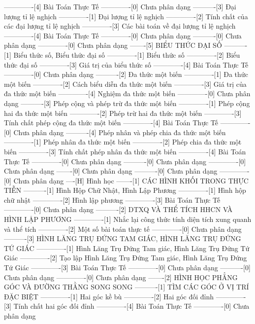 -------------[4] Bài Toán Thực Tế
-------------[0] Chưa phân dạng
----------[3] Đại lượng tỉ lệ nghịch
-------------[1] Đại lượng tỉ lệ nghịch
-------------[2] Tính chất của các đại lượng tỉ lệ nghịch
-------------[3] Các bài toán về đại lượng tỉ lệ nghịch
-------------[4] Bài Toán Thực Tế
-------------[0] Chưa phân dạng
----------[0] Chưa phân dạng
-------------[0] Chưa phân dạng
-------[5] BIỂU THỨC ĐẠI SỐ
----------[1] Biểu thức số, Biểu thức đại số
-------------[1] Biểu thức số
-------------[2] Biểu thức đại số
-------------[3] Giá trị của biểu thức số
-------------[4] Bài Toán Thực Tế
-------------[0] Chưa phân dạng
----------[2] Đa thức một biến
-------------[1] Đa thức một biến
-------------[2] Cách biểu diễn đa thức một biến
-------------[3] Giá trị của đa thức một biến
-------------[4] Nghiệm đa thức một biến
-------------[0] Chưa phân dạng
----------[3] Phép cộng và phép trừ đa thức một biến
-------------[1] Phép cộng hai đa thức một biến
-------------[2] Phép trừ hai đa thức một biến
-------------[3] Tính chất phép cộng đa thức một biến
-------------[4] Bài Toán Thực Tế
-------------[0] Chưa phân dạng
----------[4] Phép nhân và phép chia đa thức một biến
-------------[1] Phép nhân đa thức một biến
-------------[2] Phép chia đa thức một biến
-------------[3] Tính chất phép nhân đa thức một biến
-------------[4] Bài Toán Thực Tế
-------------[0] Chưa phân dạng
----------[0] Chưa phân dạng
-------------[0] Chưa phân dạng
-------[0] Chưa phân dạng
----------[0] Chưa phân dạng
-------------[0] Chưa phân dạng
----[H] Hình học
-------[1] CÁC HÌNH KHỐI TRONG THỰC TIỄN
----------[1] Hình Hộp Chữ Nhật, Hình Lập Phương
-------------[1] Hình hộp chữ nhật
-------------[2] Hình lập phương
-------------[3] Bài Toán Thực Tế
-------------[0] Chưa phân dạng
----------[2] DTXQ VÀ THỂ TÍCH HHCN VÀ HÌNH LẬP PHƯƠNG
-------------[1] Nhắc lại công thức tính diện tích xung quanh và thể tích
-------------[2] Một số bài toán thực tế
-------------[0] Chưa phân dạng
----------[3] HÌNH LĂNG TRỤ ĐỨNG TAM GIÁC, HÌNH LĂNG TRỤ ĐỨNG TỨ GIÁC
-------------[1] Hình Lăng Trụ Đứng Tam giác, Hình Lăng Trụ Đứng Tứ Giác
-------------[2] Tạo lập Hình Lăng Trụ Đứng Tam giác, Hình Lăng Trụ Đứng Tứ Giác
-------------[3] Bài Toán Thực Tế
-------------[0] Chưa phân dạng
----------[0] Chưa phân dạng
-------------[0] Chưa phân dạng
-------[2] HÌNH HỌC PHẲNG GÓC VÀ ĐƯỜNG THẰNG SONG SONG
----------[1] TÌM CÁC GÓC Ở VỊ TRÍ ĐẶC BIỆT
-------------[1] Hai góc kề bù
-------------[2] Hai góc đối đỉnh
-------------[3] Tính chất hai góc đối đỉnh
-------------[4] Bài Toán Thực Tế
-------------[0] Chưa phân dạng

